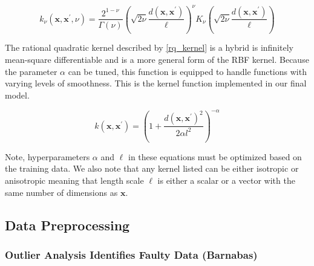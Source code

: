 \documentclass[journal=jacsat,manuscript=article]{achemso}
\begin{document}
\begin{equation}
    k_\nu(\mathbf{x}, \mathbf{x}^{\prime}, \nu) = \frac{2^{1-\nu}}{\Gamma(\nu)} \left( \sqrt{2\nu} \frac{d(\mathbf{x}, \mathbf{x}^{\prime})}{\ell} \right)^\nu K_\nu \left( \sqrt{2\nu} \frac{d(\mathbf{x}, \mathbf{x}^{\prime})}{\ell} \right)
    \label{Matern}
\end{equation}

The rational quadratic kernel described by \eqref{rq_kernel} is a hybrid is infinitely mean-square differentiable \cite{Gramacy2020Surrogates:Sciences} and is a more general form of the RBF kernel. Because the parameter $\alpha$ can be tuned, this function is equipped to handle functions with varying levels of smoothness. This is the kernel function implemented in our final model.

\begin{equation}
    k(\mathbf{x}, \mathbf{x}^{\prime}) = \left(1 + \frac{d(\mathbf{x}, \mathbf{x}^{\prime})^2}{2\alpha l^2}\right)^{-\alpha}
    \label{rq_kernel}
\end{equation}





Note, hyperparameters $\alpha$ and $\ell$ in these equations must be optimized based on the training data. We also note that any kernel listed can be either isotropic or anisotropic meaning that length scale $\ell$ is either a scalar or a vector with the same number of dimensions as $\mathbf{x}$.

\subsection{Data Preprocessing}

\subsubsection{Outlier Analysis Identifies Faulty Data (Barnabas)} 
\end{document}
